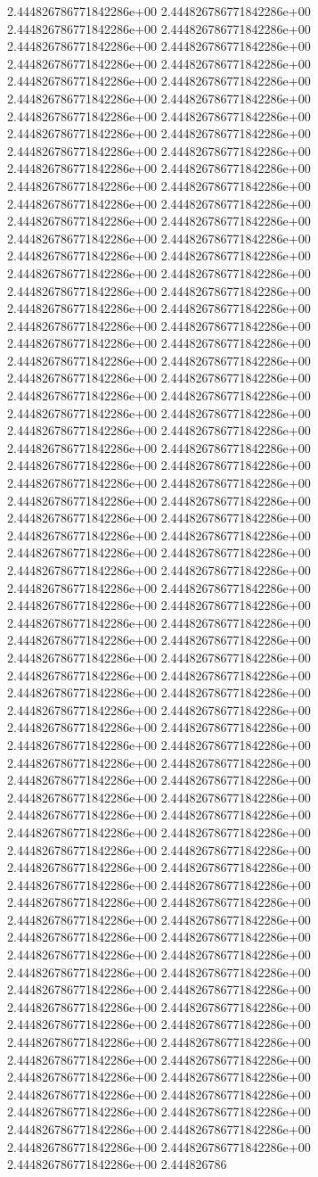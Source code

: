2.444826786771842286e+00	2.444826786771842286e+00	2.444826786771842286e+00	2.444826786771842286e+00	2.444826786771842286e+00	2.444826786771842286e+00	2.444826786771842286e+00	2.444826786771842286e+00	2.444826786771842286e+00	2.444826786771842286e+00	2.444826786771842286e+00	2.444826786771842286e+00	2.444826786771842286e+00	2.444826786771842286e+00	2.444826786771842286e+00	2.444826786771842286e+00	2.444826786771842286e+00	2.444826786771842286e+00	2.444826786771842286e+00	2.444826786771842286e+00	2.444826786771842286e+00	2.444826786771842286e+00	2.444826786771842286e+00	2.444826786771842286e+00	2.444826786771842286e+00	2.444826786771842286e+00	2.444826786771842286e+00	2.444826786771842286e+00	2.444826786771842286e+00	2.444826786771842286e+00	2.444826786771842286e+00	2.444826786771842286e+00	2.444826786771842286e+00	2.444826786771842286e+00	2.444826786771842286e+00	2.444826786771842286e+00	2.444826786771842286e+00	2.444826786771842286e+00	2.444826786771842286e+00	2.444826786771842286e+00	2.444826786771842286e+00	2.444826786771842286e+00	2.444826786771842286e+00	2.444826786771842286e+00	2.444826786771842286e+00	2.444826786771842286e+00	2.444826786771842286e+00	2.444826786771842286e+00	2.444826786771842286e+00	2.444826786771842286e+00	2.444826786771842286e+00	2.444826786771842286e+00	2.444826786771842286e+00	2.444826786771842286e+00	2.444826786771842286e+00	2.444826786771842286e+00	2.444826786771842286e+00	2.444826786771842286e+00	2.444826786771842286e+00	2.444826786771842286e+00	2.444826786771842286e+00	2.444826786771842286e+00	2.444826786771842286e+00	2.444826786771842286e+00	2.444826786771842286e+00	2.444826786771842286e+00	2.444826786771842286e+00	2.444826786771842286e+00	2.444826786771842286e+00	2.444826786771842286e+00	2.444826786771842286e+00	2.444826786771842286e+00	2.444826786771842286e+00	2.444826786771842286e+00	2.444826786771842286e+00	2.444826786771842286e+00	2.444826786771842286e+00	2.444826786771842286e+00	2.444826786771842286e+00	2.444826786771842286e+00	2.444826786771842286e+00	2.444826786771842286e+00	2.444826786771842286e+00	2.444826786771842286e+00	2.444826786771842286e+00	2.444826786771842286e+00	2.444826786771842286e+00	2.444826786771842286e+00	2.444826786771842286e+00	2.444826786771842286e+00	2.444826786771842286e+00	2.444826786771842286e+00	2.444826786771842286e+00	2.444826786771842286e+00	2.444826786771842286e+00	2.444826786771842286e+00	2.444826786771842286e+00	2.444826786771842286e+00	2.444826786771842286e+00	2.444826786771842286e+00	2.444826786771842286e+00	2.444826786771842286e+00	2.444826786771842286e+00	2.444826786771842286e+00	2.444826786771842286e+00	2.444826786771842286e+00	2.444826786771842286e+00	2.444826786771842286e+00	2.444826786771842286e+00	2.444826786771842286e+00	2.444826786771842286e+00	2.444826786771842286e+00	2.444826786771842286e+00	2.444826786771842286e+00	2.444826786771842286e+00	2.444826786771842286e+00	2.444826786771842286e+00	2.444826786771842286e+00	2.444826786771842286e+00	2.444826786771842286e+00	2.444826786771842286e+00	2.444826786771842286e+00	2.444826786771842286e+00	2.444826786771842286e+00	2.444826786771842286e+00	2.444826786771842286e+00	2.444826786771842286e+00	2.444826786771842286e+00	2.444826786771842286e+00	2.444826786771842286e+00	2.444826786771842286e+00	2.444826786771842286e+00	2.444826786771842286e+00	2.444826786